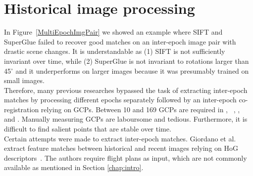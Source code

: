 \section{Historical image processing}
In Figure~\ref{MultiEpochImgPair} we showed an example where SIFT and SuperGlue failed to recover good matches on an inter-epoch image pair with drastic scene changes. It is understandable as (1) SIFT is not sufficiently invariant over time, while (2) SuperGlue is not invariant to rotations larger than 45$^\circ$ and it underperforms on larger images because it was presumably trained on small images.\\
Therefore, many previous researches bypassed the task of extracting inter-epoch matches by processing different epochs separately followed by an inter-epoch co-registration relying on \ac{GCP}s.
Between 10 and 169 \ac{GCP}s are required in \cite{pinto2019archived}, ~\cite{bozek2019analysis}, \cite{persia2020archival}, ~\cite{micheletti2015application} and \cite{molg2017structure}.
Manually measuring \ac{GCP}s are laboursome and tedious. Furthermore, it is difficult to find salient points that are stable over time.\\
Certain attempts were made to extract inter-epoch matches. Giordano et al.~\cite{giordano2018toward} extract feature matches between historical and recent images relying on HoG descriptors~\cite{dalal2005histograms}. The authors require flight plans as input, which are not commonly available as mentioned in Section \ref{chap:intro}. 
